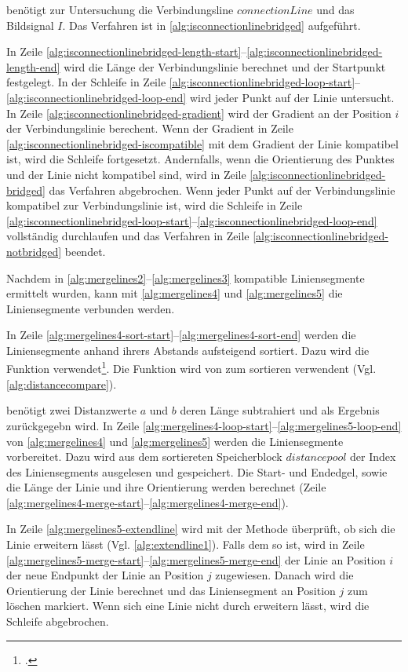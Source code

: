  benötigt zur Untersuchung die Verbindungsline $\mathit{connectionLine}$ und das
 Bildsignal $I$. Das Verfahren ist in \autoref{alg:isconnectionlinebridged} aufgeführt.

In Zeile \ref{alg:isconnectionlinebridged-length-start}--\ref{alg:isconnectionlinebridged-length-end} wird die Länge
 der Verbindungslinie berechnet und der Startpunkt festgelegt. In der Schleife in Zeile
 \ref{alg:isconnectionlinebridged-loop-start}--\ref{alg:isconnectionlinebridged-loop-end} wird jeder Punkt auf der
 Linie untersucht. In Zeile \ref{alg:isconnectionlinebridged-gradient} wird der Gradient an der Position $i$  der
 Verbindungslinie berechent. Wenn der Gradient in Zeile \ref{alg:isconnectionlinebridged-iscompatible} mit dem Gradient
 der Linie kompatibel ist, wird die Schleife fortgesetzt. Andernfalls, wenn die Orientierung des Punktes und der Linie
 nicht kompatibel sind, wird in Zeile \ref{alg:isconnectionlinebridged-bridged} das Verfahren abgebrochen. Wenn jeder
 Punkt auf der Verbindungslinie kompatibel zur Verbindungslinie ist, wird die Schleife in Zeile
 \ref{alg:isconnectionlinebridged-loop-start}--\ref{alg:isconnectionlinebridged-loop-end} vollständig durchlaufen und
 das Verfahren in Zeile \ref{alg:isconnectionlinebridged-notbridged} beendet.

Nachdem in \autoref{alg:mergelines2}--\autoref{alg:mergelines3} kompatible Liniensegmente ermittelt wurden, kann mit
 \autoref{alg:mergelines4} und \autoref{alg:mergelines5} die Liniensegmente verbunden werden.

In Zeile \ref{alg:mergelines4-sort-start}--\ref{alg:mergelines4-sort-end} werden die Liniensegmente anhand ihrers
 Abstands aufsteigend sortiert. Dazu wird die Funktion  verwendet\footcite{qsort}. Die Funktion
  wird von  zum sortieren verwendent (Vgl. \autoref{alg:distancecompare}).

 benötigt zwei Distanzwerte $a$ und $b$ deren Länge subtrahiert und als Ergebnis zurückgegebn
 wird. In Zeile \ref{alg:mergelines4-loop-start}--\ref{alg:mergelines5-loop-end} von \autoref{alg:mergelines4} und
 \autoref{alg:mergelines5} werden die Liniensegmente vorbereitet. Dazu wird aus dem sortiereten Speicherblock
 $\mathit{distancepool}$ der Index des Liniensegments ausgelesen und gespeichert. Die Start- und Endedgel, sowie die
 Länge der Linie und ihre Orientierung werden berechnet
 (Zeile \ref{alg:mergelines4-merge-start}--\ref{alg:mergelines4-merge-end}).

In Zeile \ref{alg:mergelines5-extendline} wird mit der Methode  überprüft, ob sich die Linie
 erweitern lässt (Vgl. \autoref{alg:extendline1}). Falls dem so ist, wird in Zeile
 \ref{alg:mergelines5-merge-start}--\ref{alg:mergelines5-merge-end} der Linie an Position $i$ der neue Endpunkt der
 Linie an Position $j$ zugewiesen. Danach wird die Orientierung der Linie berechnet und das Liniensegment an Position
 $j$ zum löschen markiert. Wenn sich eine Linie nicht durch  erweitern lässt, wird die Schleife
 abgebrochen.

